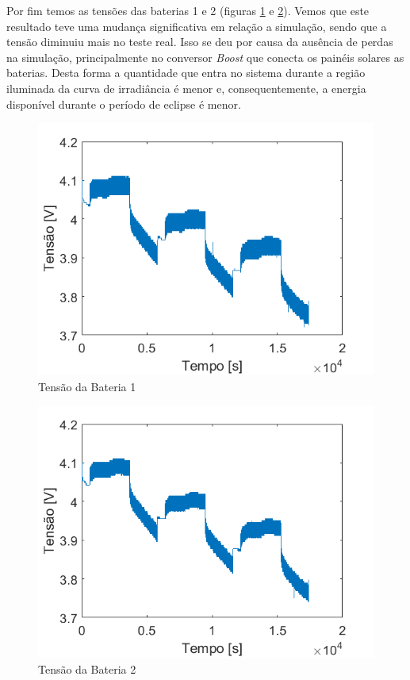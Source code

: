 Por fim temos as tensões das baterias 1 e 2 (figuras \ref{figura_teste_tensao_bat1} e \ref{figura_teste_tensao_bat2}). Vemos que este resultado teve uma mudança significativa em relação a simulação, sendo que a tensão diminuiu mais no teste real. Isso se deu por causa da ausência de perdas na simulação, principalmente no conversor \textit{Boost} que conecta os painéis solares as baterias. Desta forma a quantidade que entra no sistema durante a região iluminada da curva de irradiância é menor e, consequentemente, a energia disponível durante o período de eclipse é menor.

\begin{figure}[!htpb]
\begin{center}
\includegraphics[scale=0.5]{figures/testBat1Voltage.png}
\caption{Tensão da Bateria 1}
\label{figura_teste_tensao_bat1}
\end{center}
\end{figure}

\begin{figure}[!htpb]
\begin{center}
\includegraphics[scale=0.5]{figures/testBat2Voltage.png}
\caption{Tensão da Bateria 2}
\label{figura_teste_tensao_bat2}
\end{center}
\end{figure}
